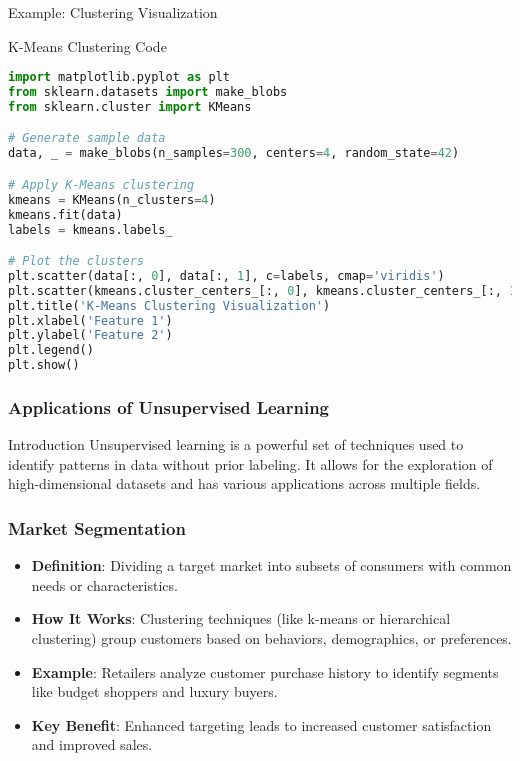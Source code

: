 \documentclass[aspectratio=169]{beamer}
\begin{document}
\begin{frame}[fragile]{Example: Clustering Visualization}
    \begin{block}{K-Means Clustering Code}
        \begin{lstlisting}[language=Python]
import matplotlib.pyplot as plt
from sklearn.datasets import make_blobs
from sklearn.cluster import KMeans

# Generate sample data
data, _ = make_blobs(n_samples=300, centers=4, random_state=42)

# Apply K-Means clustering
kmeans = KMeans(n_clusters=4)
kmeans.fit(data)
labels = kmeans.labels_

# Plot the clusters
plt.scatter(data[:, 0], data[:, 1], c=labels, cmap='viridis')
plt.scatter(kmeans.cluster_centers_[:, 0], kmeans.cluster_centers_[:, 1], s=300, c='red', label='Centroids')
plt.title('K-Means Clustering Visualization')
plt.xlabel('Feature 1')
plt.ylabel('Feature 2')
plt.legend()
plt.show()
        \end{lstlisting}
    \end{block}
\end{frame}

\begin{frame}[fragile]
    \frametitle{Applications of Unsupervised Learning}
    \begin{block}{Introduction}
        Unsupervised learning is a powerful set of techniques used to identify patterns in data without prior labeling. It allows for the exploration of high-dimensional datasets and has various applications across multiple fields.
    \end{block}
\end{frame}

\begin{frame}[fragile]
    \frametitle{Market Segmentation}
    \begin{itemize}
        \item \textbf{Definition}: Dividing a target market into subsets of consumers with common needs or characteristics.
        \item \textbf{How It Works}: Clustering techniques (like k-means or hierarchical clustering) group customers based on behaviors, demographics, or preferences.
        \item \textbf{Example}: Retailers analyze customer purchase history to identify segments like budget shoppers and luxury buyers.
        \item \textbf{Key Benefit}: Enhanced targeting leads to increased customer satisfaction and improved sales.
    \end{itemize}
\end{frame}
\end{document}
